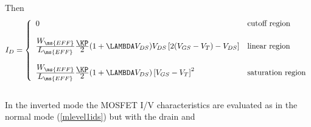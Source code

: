 Then
\begin{equation}
I_{D} = \left\{ \begin{array}{ll}
      0  & \mbox{cutoff region} \\ \\
      { {\textstyle W_{\ms{EFF}}} \over {\textstyle L_{\ms{EFF}}}}
      {{\textstyle \KP} \over {\textstyle 2}}
      ( 1+\LAMBDA V_{DS})
      V_{DS} \left[2(V_{GS}-V_{T})-V_{DS}\right]
         &\mbox{linear region} \\ \\
      { {\textstyle W_{\ms{EFF}}} \over {\textstyle L_{\ms{EFF}}}}
      {{\textstyle \KP} \over {\textstyle 2}}
      (1+\LAMBDA V_{DS})
      \left[V_{GS}-V_{T}\right]^2
         &\mbox{saturation region} \end{array} \right. %
      \label{mlevel1ids}
\end{equation}
\\[0.2in]
In the inverted mode the MOSFET I/V characteristics are evaluated
as in the normal mode (\ref{mlevel1ids}) but with the drain and
